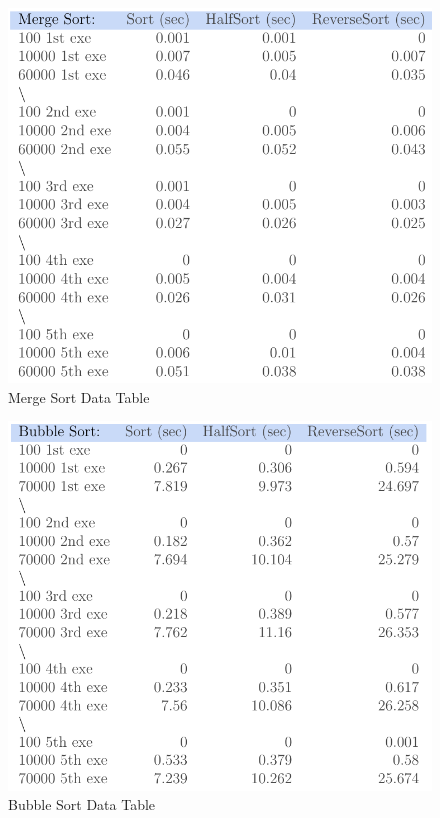 \documentclass[12pt]{article}
\begin{document}
\begin{figure}[h]
	\centering
	\includegraphics[scale=.7]{MSdatatable.PNG}
	\caption{Merge Sort Data Table}
	\label{fig:mesh1}
\end{figure}
\begin{figure}[h]
	\centering
	\includegraphics[scale=.7]{BSdatatable.PNG}
	\caption{Bubble Sort Data Table}
	\label{fig:mesh1}
\end{figure}
\end{document}
